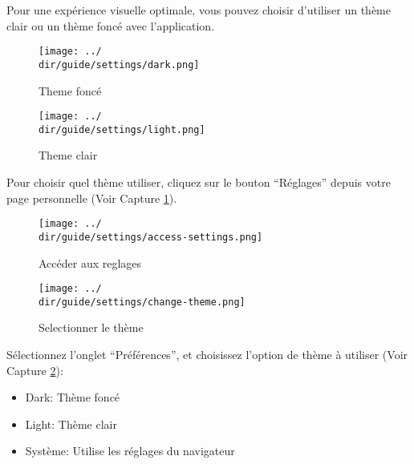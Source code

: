Pour une expérience visuelle optimale, vous pouvez choisir d’utiliser un thème clair ou un thème foncé avec l’application.

\begin{multicols}{2}
\begin{figure}[H]
	\texttt{[image: ../\\dir/guide/settings/dark.png]}
	\caption{Theme foncé}
\end{figure}
\begin{figure}[H]
	\texttt{[image: ../\\dir/guide/settings/light.png]}
	\caption{Theme clair}
\end{figure}
\end{multicols}

Pour choisir quel thème utiliser, cliquez sur le bouton “Réglages” depuis votre page personnelle (Voir Capture \ref{fig:access-settings}).

\begin{figure}[H]
	\texttt{[image: ../\\dir/guide/settings/access-settings.png]}
	\caption{Accéder aux reglages}
	\label{fig:access-settings}
\end{figure}
\begin{figure}[H]
	\texttt{[image: ../\\dir/guide/settings/change-theme.png]}
	\caption{Selectionner le thème}
	\label{fig:change-theme}
\end{figure}

Sélectionnez l’onglet “Préférences”, et choisissez l’option de thème à utiliser (Voir Capture \ref{fig:change-theme}):

\begin{itemize}
 	\item Dark: Thème foncé
 	\item Light: Thème clair
 	\item Système: Utilise les réglages du navigateur
\end{itemize}
